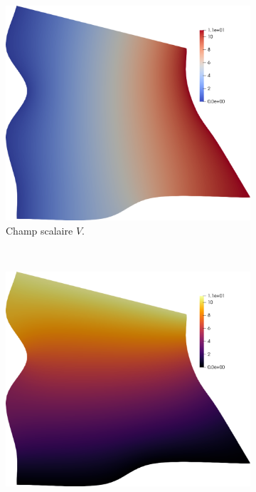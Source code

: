\begin{figure}[h!]
\centering
\begin{subfigure}{0.48\textwidth}
    \includegraphics[width=\textwidth]{images/quad_equation_1.pdf}
    \caption{Champ scalaire $V$.}
    \label{fig:quad_equation_1}
\end{subfigure}
\\[0.5cm]
\begin{subfigure}{0.48\textwidth}
    \includegraphics[width=\textwidth]{images/quad_equation_2.pdf}

\end{subfigure}
\end{figure}
